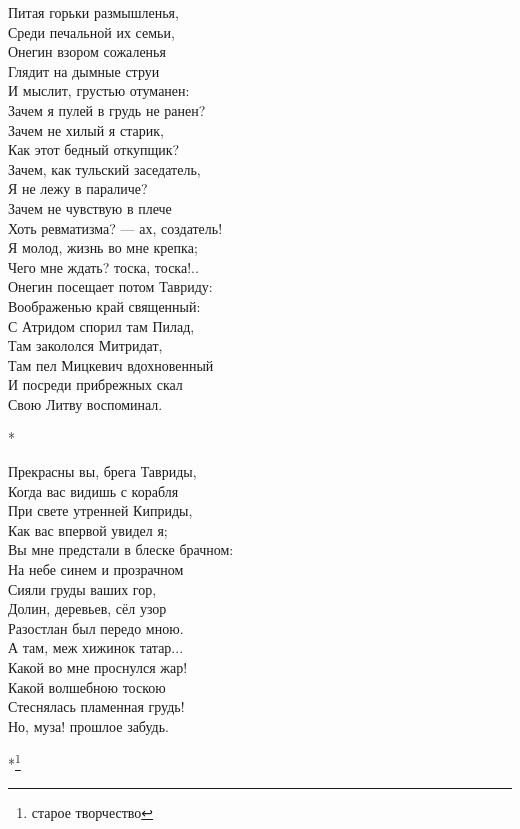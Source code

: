 Питая горьки размышленья,\\
Среди печальной их семьи,\\
Онегин взором сожаленья\\
Глядит на дымные струи\\
И мыслит, грустью отуманен:\\
Зачем я пулей в грудь не ранен?\\
Зачем не хилый я старик,\\
Как этот бедный откупщик?\\
Зачем, как тульский заседатель,\\
Я не лежу в параличе?\\
Зачем не чувствую в плече\\
Хоть ревматизма? — ах, создатель!\\
Я молод, жизнь во мне крепка;\\
Чего мне ждать? тоска, тоска!..\\
Онегин посещает потом Тавриду:\\
Воображенью край священный:\\
С Атридом спорил там Пилад,\\
Там закололся Митридат,\\
Там пел Мицкевич вдохновенный\\
И посреди прибрежных скал\\
Свою Литву воспоминал.

*

Прекрасны вы, брега Тавриды,\\
Когда вас видишь с корабля\\
При свете утренней Киприды,\\
Как вас впервой увидел я;\\
Вы мне предстали в блеске брачном:\\
На небе синем и прозрачном\\
Сияли груды ваших гор,\\
Долин, деревьев, сёл узор\\
Разостлан был передо мною.\\
А там, меж хижинок татар...\\
Какой во мне проснулся жар!\\
Какой волшебною тоскою\\
Стеснялась пламенная грудь!\\
Но, муза! прошлое забудь.

*\footnote{старое творчество}


